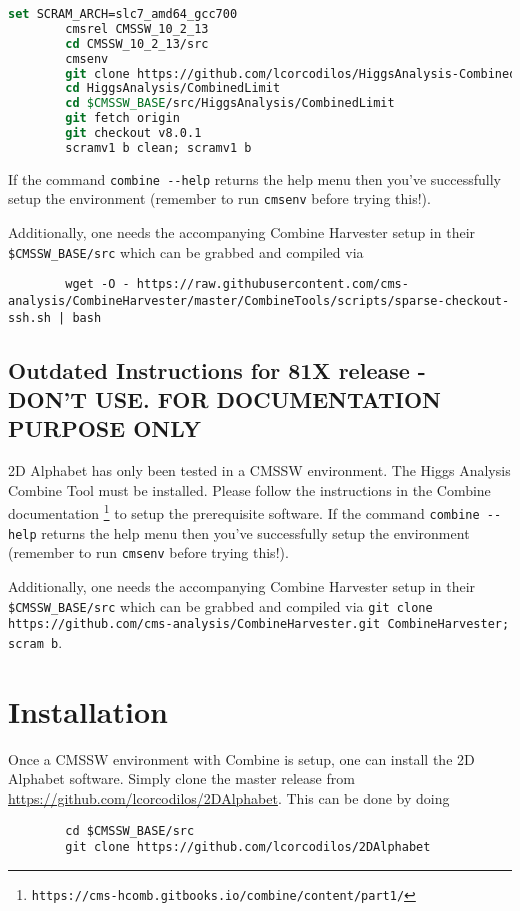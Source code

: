 \documentclass[letter]{article}
\begin{document}
    \begin{lstlisting}[language=csh]
        set SCRAM_ARCH=slc7_amd64_gcc700
        cmsrel CMSSW_10_2_13
        cd CMSSW_10_2_13/src
        cmsenv
        git clone https://github.com/lcorcodilos/HiggsAnalysis-CombinedLimit.git HiggsAnalysis/CombinedLimit
        cd HiggsAnalysis/CombinedLimit
        cd $CMSSW_BASE/src/HiggsAnalysis/CombinedLimit
        git fetch origin
        git checkout v8.0.1
        scramv1 b clean; scramv1 b
    \end{lstlisting}

    If the command \verb"combine --help" returns the help menu then you've successfully setup the environment (remember to run \verb"cmsenv" before trying this!).

    Additionally, one needs the accompanying Combine Harvester setup in their \verb"$CMSSW_BASE/src" which can be grabbed and compiled via 

    \begin{lstlisting}
        wget -O - https://raw.githubusercontent.com/cms-analysis/CombineHarvester/master/CombineTools/scripts/sparse-checkout-ssh.sh | bash
    \end{lstlisting}

    \subsection{Outdated Instructions for 81X release - DON'T USE. FOR DOCUMENTATION PURPOSE ONLY}
    2D Alphabet has only been tested in a CMSSW environment. The Higgs Analysis Combine Tool must be installed. Please follow the instructions in the Combine documentation \footnote{\verb"https://cms-hcomb.gitbooks.io/combine/content/part1/"} to setup the prerequisite software. If the command \verb"combine --help" returns the help menu then you've successfully setup the environment (remember to run \verb"cmsenv" before trying this!).

    Additionally, one needs the accompanying Combine Harvester setup in their \verb"$CMSSW_BASE/src" which can be grabbed and compiled via \verb"git clone https://github.com/cms-analysis/CombineHarvester.git CombineHarvester; scram b".

\section{Installation}

    Once a CMSSW environment with Combine is setup, one can install the 2D Alphabet software. Simply clone the master release from \url{https://github.com/lcorcodilos/2DAlphabet}. This can be done by doing
    \begin{lstlisting}
        cd $CMSSW_BASE/src
        git clone https://github.com/lcorcodilos/2DAlphabet
    \end{lstlisting}
    
\end{document}
